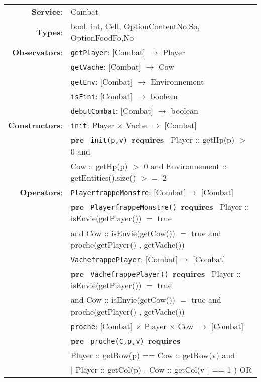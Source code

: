 \documentclass{article}
\begin{document}
\begin{tabular}{rl}
\textbf{Service}: & \textrm{Combat}  \\
\textbf{Types}: & \textrm{bool}, \textrm{int}, \textrm{Cell}, OptionContent{No,So}, OptionFood{Fo,No}  \\


\textbf{Observators}: & \texttt{getPlayer}: \textrm{[Combat]} $\rightarrow$ \textrm{Player} \\
& \texttt{getVache}: \textrm{[Combat]} $\rightarrow$ \textrm{Cow} \\
& \texttt{getEnv}: \textrm{[Combat]} $\rightarrow$ \textrm{Environnement} \\
& \texttt{isFini}: \textrm{[Combat]} $\rightarrow$ \textrm{boolean} \\
& \texttt{debutCombat}: \textrm{[Combat]} $\rightarrow$ \textrm{boolean} \\
\textbf{Constructors}: & \texttt{init}: \textrm{Player} $\times$ \textrm{Vache} $\rightarrow$ \textrm{[Combat]} \\
& \quad\quad \textbf{pre}~ \texttt{init(p,v)}~\textbf{requires}~ Player :: getHp(p) $>$ 0 and \\
& \quad\quad\quad Cow :: getHp(p) $>$ 0 and Environnement :: getEntities().size() $>=$ 2\\
\textbf{Operators}: 
& \texttt{PlayerfrappeMonstre}: \textrm{[Combat]}$\rightarrow$ \textrm{[Combat]} \\
& \quad\quad \textbf{pre}~ \texttt{PlayerfrappeMonstre()}~\textbf{requires}~ Player :: isEnvie(getPlayer()) $=$ true \\
& \quad \quad \quad and Cow :: isEnvie(getCow()) $=$ true and proche(getPlayer() , getVache())\\

& \texttt{VachefrappePlayer}: \textrm{[Combat]}$\rightarrow$ \textrm{[Combat]} \\
& \quad\quad \textbf{pre}~
\texttt{VachefrappePlayer()}~\textbf{requires}~ Player :: isEnvie(getPlayer()) $=$ true \\
& \quad \quad \quad and Cow :: isEnvie(getCow()) $=$ true and proche(getPlayer() , getVache())\\

& \texttt{proche}: \textrm{[Combat]} $\times$ Player $\times$ Cow $\rightarrow$ \textrm{[Combat]} \\
& \quad\quad \textbf{pre}~
\texttt{proche(C,p,v)}~\textbf{requires}~ \\
&\quad \quad \quad Player :: getRow(p) == Cow :: getRow(v) and\\
&\quad \quad \quad $|$ Player :: getCol(p) - Cow :: getCol(v $|$ == 1 ) OR \\


\end{tabular}
\end{document}
